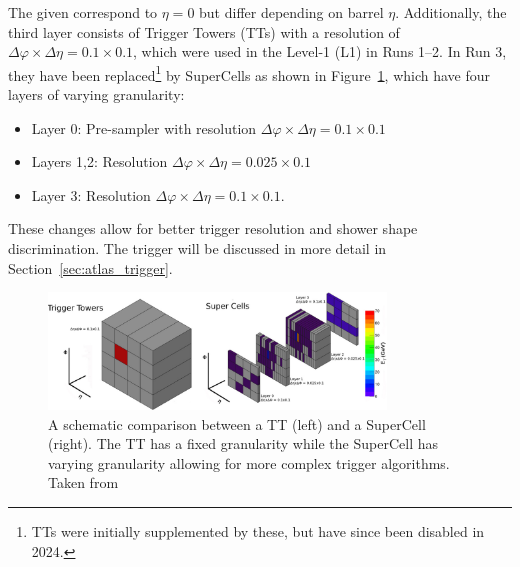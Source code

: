 The given \radlength{} correspond to $\eta = 0$ but differ depending on barrel $\eta$. Additionally, the third layer consists of Trigger Towers (TTs) with a resolution of $\Delta\varphi \times \Delta\eta = 0.1 \times 0.1$, which were used in the Level-1 (L1) in Runs 1--2. In Run 3, they have been replaced\footnote{TTs were initially supplemented by these, but have since been disabled in 2024.} by SuperCells as shown in Figure~\ref{fig:atlas_super_cells}, which have four layers of varying granularity:
\begin{itemize}
    \setlength\itemsep{0em}
    \setlength\parskip{0pt}
    \item Layer 0: Pre-sampler with resolution $\Delta\varphi \times \Delta\eta = 0.1 \times 0.1$
    \item Layers 1,2: Resolution $\Delta\varphi \times \Delta\eta = 0.025 \times 0.1$
    \item Layer 3: Resolution $\Delta\varphi \times \Delta\eta = 0.1 \times 0.1$.
\end{itemize}
These changes allow for better trigger resolution and shower shape discrimination. The trigger will be discussed in more detail in Section~\ref{sec:atlas_trigger}.

\begin{figure}[htp]
    \centering
    \includegraphics[width=0.8\textwidth]{figures/atlas/atlas_calorimeter_tt_to_supercell.jpg}
    \caption{A schematic comparison between a TT (left) and a SuperCell (right). The TT has a fixed granularity while the SuperCell has varying granularity allowing for more complex trigger algorithms. Taken from~\cite{atlas_calorimeter_supercell}}\label{fig:atlas_super_cells}
\end{figure}